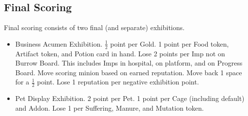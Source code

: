 \documentclass[12pt]{article}
\newenvironment{itemizeCustom}
{\begin{itemize}
  \setlength{\itemsep}{1pt}
  \setlength{\parskip}{0pt}
  \setlength{\parsep}{0pt}}
{\end{itemize}}
\begin{document}
\begin{multicols*}{2}
\section*{Final Scoring}
Final scoring consists of two final (and separate) exhibitions.
\begin{itemizeCustom}
	\item Business Acumen Exhibition. $\frac{1}{2}$ point per Gold. 1 point per Food token, Artifact token, and Potion card in hand. Lose 2 points per Imp not on Burrow Board. This includes Imps in hospital, on platform, and on Progress Board. Move scoring minion based on earned reputation. Move back 1 space for a $\frac{1}{2}$ point. Lose 1 reputation per negative exhibition point.
	\item Pet Display Exhibition. 2 point per Pet. 1 point per Cage (including default) and Addon. Lose 1 per Suffering, Manure, and Mutation token.
\end{itemizeCustom}

\end{multicols*}
\end{document}
